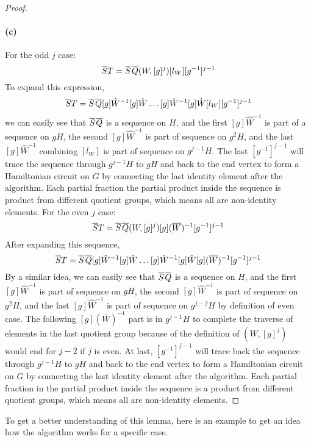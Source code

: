 \documentclass{article}
\begin{document}
\begin{proof}
\paragraph{(c)} For the odd $j$ case:
\[
\overline{S}T = \overline{S}\mkern2mu\overline{Q}(W, [g]^j)[l_W][g^{-1}]^{j-1}
\]
To expand this expression, 
\[
\overline{S}T = \overline{S}\mkern2mu\overline{Q}[g]{\hat{W}}^{-1}[g]\hat{W}\dots[g]{\hat{W}}^{-1}[g]\hat{W}[l_W][g^{-1}]^{j-1}
\]
we can easily see that $\overline{S}\mkern2mu\overline{Q}$ is a sequence on $H$, and the first $[g]{\hat{W}}^{-1}$ is part of a sequence on $gH$, the second $[g]{\hat{W}}^{-1}$ is part of sequence on $g^2H$, and the last $[g]{\hat{W}}^{-1}$ combining $[l_W]$ is part of sequence on $g^{j-1}H$. The last $[g^{-1}]^{j-1}$ will trace the sequence through $g^{j-1}H$ to $gH$ and back to the end vertex to form a Hamiltonian circuit on $G$ by connecting the last identity element after the algorithm. Each partial fraction the partial product inside the sequence is product from different quotient groups, which means all are non-identity elements. 
For the even $j$ case:
\[
\overline{S}T = \overline{S}\mkern2mu\overline{Q}(W, [g]^j)[g](\overline{W})^{-1}[g^{-1}]^{j-1}
\]
After expanding this sequence, 
\[
\overline{S}T = \overline{S}\mkern2mu\overline{Q}[g]{\hat{W}}^{-1}[g]\hat{W}\dots[g]{\hat{W}}^{-1}[g]\hat{W}[g](\overline{W})^{-1}[g^{-1}]^{j-1}
\]
By a similar idea, we can easily see that $\overline{S}\mkern2mu\overline{Q}$ is a sequence on $H$, and the first $[g]{\hat{W}}^{-1}$ is part of sequence on $gH$, the second $[g]{\hat{W}}^{-1}$ is part of sequence on $g^2H$, and the last $[g]{\hat{W}}^{-1}$ is part of sequence on $g^{j-2}H$ by definition of even case. The following $[g](\overline{W})^{-1}$ part is in $g^{j-1}H$ to complete the traverse of elements in the last quotient group because of the definition of $(W, [g]^j)$ would end for $j-2$ if $j$ is even. At last, $[g^{-1}]^{j-1}$ will trace back the sequence through $g^{j-1}H$ to $gH$ and back to the end vertex to form a Hamiltonian circuit on $G$ by connecting the last identity element after the algorithm. Each partial fraction in the partial product inside the sequence is a product from different quotient groups, which means all are non-identity elements.
\end{proof}
To get a better understanding of this lemma, here is an example to get an idea how the algorithm works for a specific case.
\end{document}
